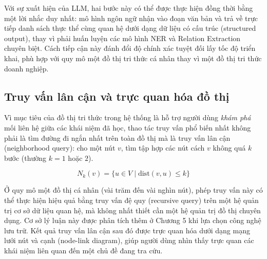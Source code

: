 Với sự xuất hiện của LLM, hai bước này có thể được thực hiện đồng thời bằng một lời nhắc duy nhất: mô hình ngôn ngữ nhận vào đoạn văn bản và trả về trực tiếp danh sách thực thể cùng quan hệ dưới dạng dữ liệu có cấu trúc (structured output), thay vì phải huấn luyện các mô hình NER và Relation Extraction chuyên biệt. Cách tiếp cận này đánh đổi độ chính xác tuyệt đối lấy tốc độ triển khai, phù hợp với quy mô một đồ thị tri thức cá nhân thay vì một đồ thị tri thức doanh nghiệp.

\subsection{Truy vấn lân cận và trực quan hóa đồ thị}
Vì mục tiêu của đồ thị tri thức trong hệ thống là hỗ trợ người dùng \textit{khám phá} mối liên hệ giữa các khái niệm đã học, thao tác truy vấn phổ biến nhất không phải là tìm đường đi ngắn nhất trên toàn đồ thị mà là truy vấn lân cận (neighborhood query): cho một nút $v$, tìm tập hợp các nút cách $v$ không quá $k$ bước (thường $k = 1$ hoặc $2$).

$$N_k(v) = \{ u \in V \mid \text{dist}(v, u) \le k \}$$

Ở quy mô một đồ thị cá nhân (vài trăm đến vài nghìn nút), phép truy vấn này có thể thực hiện hiệu quả bằng truy vấn đệ quy (recursive query) trên một hệ quản trị cơ sở dữ liệu quan hệ, mà không nhất thiết cần một hệ quản trị đồ thị chuyên dụng. Cơ sở lý luận này được phân tích thêm ở Chương 5 khi lựa chọn công nghệ lưu trữ. Kết quả truy vấn lân cận sau đó được trực quan hóa dưới dạng mạng lưới nút và cạnh (node-link diagram), giúp người dùng nhìn thấy trực quan các khái niệm liên quan đến một chủ đề đang tra cứu.
